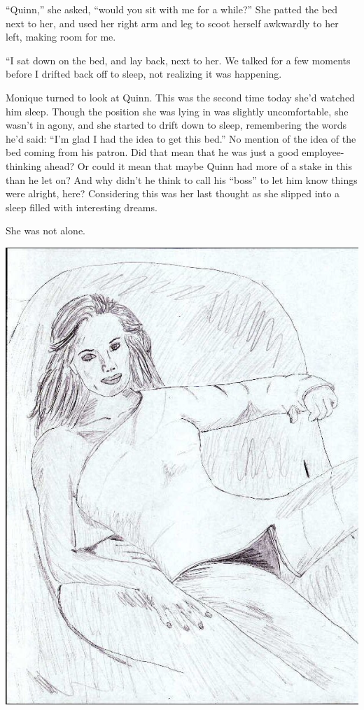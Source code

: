 ``Quinn,'' she asked, ``would you sit with me for a while?'' She patted the bed next to
her, and used her right arm and leg to scoot herself awkwardly to her left, making room for me.

``I sat down on the bed, and lay back, next to her. We talked for a few moments before I
drifted back off to sleep, not realizing it was happening.

\begin{thought}
Monique turned to look at Quinn. This was the second time today she'd watched him sleep.
Though the position she was lying in was slightly uncomfortable, she wasn't in agony, and she
started to drift down to sleep, remembering the words he'd said: ``I'm glad I had the
idea to get this bed.'' No mention of the idea of the bed coming from his patron. Did that mean
that he was just a good employee- thinking ahead? Or could it mean that maybe Quinn had more of
a stake in this than he let on? And why didn't he think to call his ``boss'' to let him know
things were alright, here? Considering this was her last thought as she slipped into a sleep
filled with interesting dreams.
\end{thought}

She was not alone.

\begin{center}
\includegraphics{images/kicks27.jpg}
\end{center}
